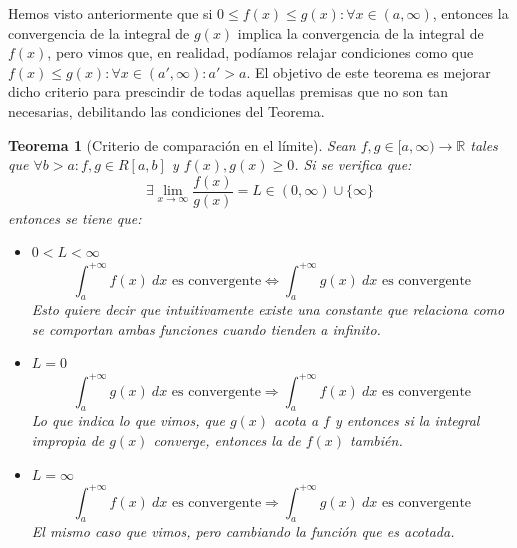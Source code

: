 \documentclass[10pt,a4paper,openright]{book}
\theoremstyle{break}
\newtheorem*{theo}{Teorema}
\newcommand{\dif}[1]{\ d#1}
\begin{document}
Hemos visto anteriormente que si $0\leq f(x)\leq g(x):\forall x \in (a,\infty)$, entonces la convergencia de la integral de $g(x)$ implica la convergencia de la integral de $f(x)$, pero vimos que, en realidad, podíamos relajar condiciones como que $f(x)\leq g(x): \forall x\in (a',\infty) : a' > a$. El objetivo de este teorema es mejorar dicho criterio para prescindir de todas aquellas premisas que no son tan necesarias, debilitando las condiciones del Teorema.

\begin{theo}[Criterio de comparación en el límite]
Sean $f,g\in [a,\infty)\rightarrow \mathbb R$ tales que $\forall b > a: f,g\in R[a,b]$ y $f(x),g(x)\geq 0$. Si se verifica que:
$$\exists \lim_{x \rightarrow \infty} \frac{f(x)}{g(x)} = L \in (0, \infty)\cup \{\infty\}$$
entonces se tiene que:
\begin{itemize}
\item $0< L < \infty$
$$\int_{a}^{+\infty} f(x) \dif{x} \mbox{ es convergente}\Leftrightarrow \int_{a}^{+\infty} g(x) \dif{x} \mbox{ es convergente}$$
Esto quiere decir que intuitivamente existe una constante que relaciona como se comportan ambas funciones cuando tienden a infinito.
\item $L=0$
$$\int_{a}^{+\infty} g(x)\dif{x}\mbox{ es convergente}\Rightarrow \int_{a}^{+\infty} f(x)\dif{x}\mbox{ es convergente}$$
Lo que indica lo que vimos, que $g(x)$ acota a $f$ y entonces si la integral impropia de $g(x)$ converge, entonces la de $f(x)$ también.
\item $L=\infty$
$$\int_{a}^{+\infty} f(x)\dif{x}\mbox{ es convergente}\Rightarrow \int_{a}^{+\infty} g(x)\dif{x}\mbox{ es convergente}$$
El mismo caso que vimos, pero cambiando la función que es acotada.
\end{itemize}
\end{theo}
\end{document}
